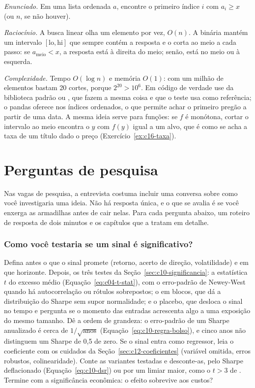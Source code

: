 \emph{Enunciado.} Em uma lista ordenada $a$, encontre o primeiro índice $i$ com $a_i \ge x$ (ou $n$, se não houver).

\emph{Raciocínio.} A busca linear olha um elemento por vez, $O(n)$. A binária mantém um intervalo $[\text{lo}, \text{hi}]$ que sempre contém a resposta e o corta ao meio a cada passo: se $a_{\text{meio}} < x$, a resposta está à direita do meio; senão, está no meio ou à esquerda.



\emph{Complexidade.} Tempo $O(\log n)$ e memória $O(1)$: com um milhão de elementos bastam 20 cortes, porque $2^{20} > 10^6$. Em código de verdade use  da biblioteca padrão ou , que fazem a mesma coisa e que o teste usa como referência; o pandas oferece  nos índices ordenados, o que permite achar o primeiro pregão a partir de uma data. A mesma ideia serve para funções: se $f$ é monótona, cortar o intervalo ao meio encontra o $y$ com $f(y)$ igual a um alvo, que é como se acha a taxa de um título dado o preço (Exercício~\ref{ex:c16-taxa}).

\section{Perguntas de pesquisa}
\label{sec:c16-pesquisa}

Nas vagas de pesquisa, a entrevista costuma incluir uma conversa sobre como você investigaria uma ideia. Não há resposta única, e o que se avalia é se você enxerga as armadilhas antes de cair nelas. Para cada pergunta abaixo, um roteiro de resposta de dois minutos e os capítulos que a tratam em detalhe.

\subsubsection{Como você testaria se um sinal é significativo?}
Defina antes o que o sinal promete (retorno, acerto de direção, volatilidade) e em que horizonte. Depois, os três testes da Seção~\ref{sec:c10-significancia}: a estatística $t$ do excesso médio (Equação~\eqref{eq:c04-t-stat}), com o erro-padrão de Newey-West quando há autocorrelação ou rótulos sobrepostos; o  em blocos, que dá a distribuição do Sharpe sem supor normalidade; e o placebo, que desloca o sinal no tempo e pergunta se o momento das entradas acrescenta algo a uma exposição do mesmo tamanho. Dê a ordem de grandeza: o erro-padrão de um Sharpe anualizado é cerca de $1/\sqrt{\text{anos}}$ (Equação~\eqref{eq:c10-regra-bolso}), e cinco anos não distinguem um Sharpe de 0,5 de zero. Se o sinal entra como regressor, leia o coeficiente com os cuidados da Seção~\ref{sec:c12-coeficientes} (variável omitida, erros robustos, colinearidade). Conte as variantes testadas e desconte-as, pelo Sharpe deflacionado (Equação~\eqref{eq:c10-dsr}) ou por um limiar maior, como o $t > 3$ de \citet{harvey2016}. Termine com a significância econômica: o efeito sobrevive aos custos?


